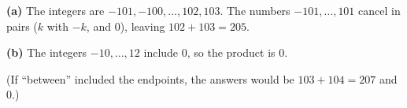 \textbf{(a)} The integers are $-101,-100,\dots,102,103$. The numbers $-101,\dots,101$ cancel in pairs ($k$ with $-k$, and $0$), leaving $102+103=\boxed{205}$.

\textbf{(b)} The integers $-10,\dots,12$ include $0$, so the product is $\boxed{0}$.

(If ``between'' included the endpoints, the answers would be $103+104=207$ and $0$.)
